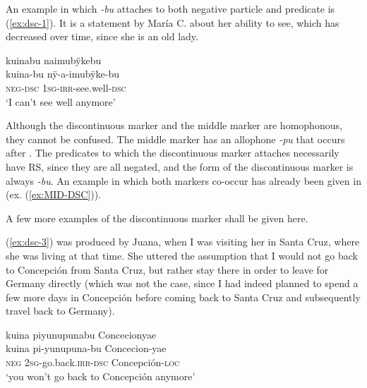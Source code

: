 An example in which \textit{-bu} attaches to both negative particle and predicate is (\ref{ex:dsc-1}). It is a statement by María C. about her ability to see, which has decreased over time, since she is an old lady.

\ea\label{ex:dsc-1}
\begingl 
\glpreamble kuinabu naimubÿkebu\\
\gla kuina-bu nÿ-a-imubÿke-bu\\ 
\glb \textsc{neg}-\textsc{dsc} 1\textsc{sg}-\textsc{irr}-see.well-\textsc{dsc}\\ 
\glft ‘I can’t see well anymore’\\ 
\endgl
\trailingcitation{[uxx-p110825l.013]}
\xe


Although the discontinuous marker and the middle marker are homophonous, they cannot be confused. The middle marker has an allophone \textit{-pu} that occurs after . The predicates to which the discontinuous marker attaches necessarily have  RS, since they are all negated, and the form of the discontinuous marker is always \textit{-bu}. An example in which both markers co-occur has already been given in  (ex. (\ref{ex:MID-DSC})).

A few more examples of the discontinuous marker shall be given here.

(\ref{ex:dsc-3}) was produced by Juana, when I was visiting her in Santa Cruz, where she was living at that time. She uttered the assumption that I would not go back to Concepción from Santa Cruz, but rather stay there in order to leave for Germany directly (which was not the case, since I had indeed planned to spend a few more days in Concepción before coming back to Santa Cruz and subsequently travel back to Germany).

\ea\label{ex:dsc-3}
\begingl 
\glpreamble kuina piyunupunabu Concecionyae\\
\gla kuina pi-yunupuna-bu Concecion-yae\\ 
\glb \textsc{neg} 2\textsc{sg}-go.back.\textsc{irr}-\textsc{dsc} Concepción-\textsc{loc}\\ 
\glft ‘you won’t go back to Concepción anymore’\\ 
\endgl
\trailingcitation{[jxx-p120430l-1.134]}
\xe

